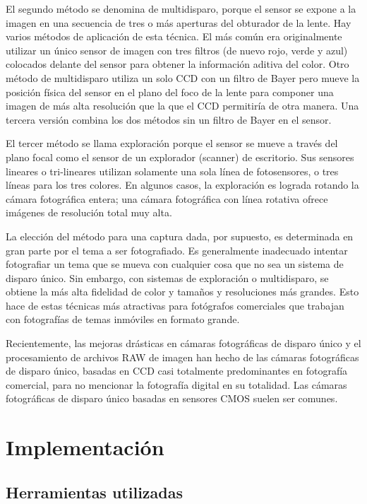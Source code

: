 \documentclass[12pt,a4paper]{report}
\begin{document}
El segundo método se denomina de multidisparo, porque el sensor se expone a la imagen en una secuencia de tres o más aperturas del obturador de la lente. Hay varios métodos de aplicación de esta técnica. El más común era originalmente utilizar un único sensor de imagen con tres filtros (de nuevo rojo, verde y azul) colocados delante del sensor para obtener la información aditiva del color. Otro método de multidisparo utiliza un solo CCD con un filtro de Bayer pero mueve la posición física del sensor en el plano del foco de la lente para componer una imagen de más alta resolución que la que el CCD permitiría de otra manera. Una tercera versión combina los dos métodos sin un filtro de Bayer en el sensor.

El tercer método se llama exploración porque el sensor se mueve a través del plano focal como el sensor de un explorador (scanner) de escritorio. Sus sensores lineares o tri-lineares utilizan solamente una sola línea de fotosensores, o tres líneas para los tres colores. En algunos casos, la exploración es lograda rotando la cámara fotográfica entera; una cámara fotográfica con línea rotativa ofrece imágenes de resolución total muy alta.

La elección del método para una captura dada, por supuesto, es determinada en gran parte por el tema a ser fotografiado. Es generalmente inadecuado intentar fotografiar un tema que se mueva con cualquier cosa que no sea un sistema de disparo único. Sin embargo, con sistemas de exploración o multidisparo, se obtiene la más alta fidelidad de color y tamaños y resoluciones más grandes. Esto hace de estas técnicas más atractivas para fotógrafos comerciales que trabajan con fotografías de temas inmóviles en formato grande.

Recientemente, las mejoras drásticas en cámaras fotográficas de disparo único y el procesamiento de archivos RAW de imagen han hecho de las cámaras fotográficas de disparo único, basadas en CCD casi totalmente predominantes en fotografía comercial, para no mencionar la fotografía digital en su totalidad. Las cámaras fotográficas de disparo único basadas en sensores CMOS suelen ser comunes.


\chapter{Implementación}

\section{Herramientas utilizadas}
\end{document}
